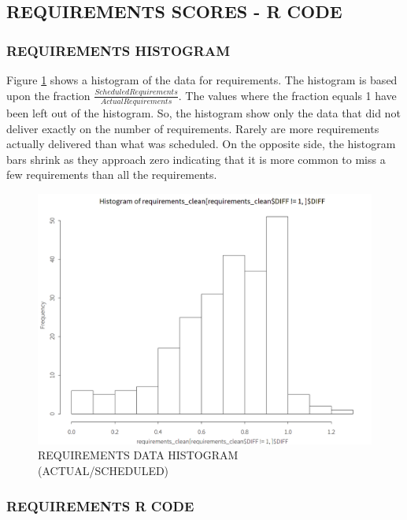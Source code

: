 \documentclass[SDSUThesis.tex]{subfiles}
\begin{document}
        
    \subsection{REQUIREMENTS SCORES - R CODE}
        \subsubsection{REQUIREMENTS HISTOGRAM}
        \label{app:requirements-hist}
            Figure \ref{fig:req-hist} shows a histogram of the data
            for requirements.  The histogram is based upon the
            fraction $\frac{Scheduled Requirements}{Actual Requirements}$. The
            values where the fraction equals 1 have been left out of the histogram.
            So, the histogram show only the data that did not deliver exactly
            on the number of requirements. Rarely are more requirements actually 
            delivered than what was scheduled.  On the opposite side, the histogram
            bars shrink as they approach zero indicating that it is more common
            to miss a few requirements than all the requirements.
            
            \begin{figure}[ht]
                \centering
                \includegraphics[scale=.3]{images/req_hist.png}
                \caption{REQUIREMENTS DATA HISTOGRAM (ACTUAL/SCHEDULED)}
                \label{fig:req-hist}
            \end{figure}
        
        \subsubsection{REQUIREMENTS R CODE}
        
        
\end{document}
